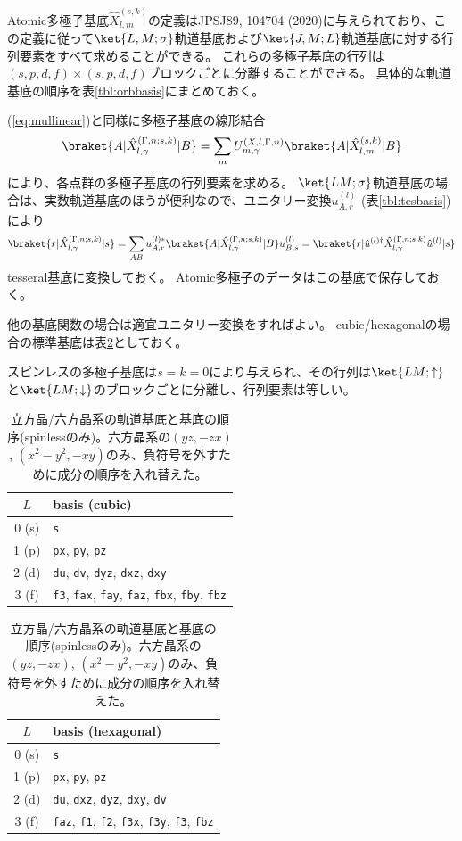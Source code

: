 \documentclass[11pt]{easymemo}
\begin{document}
Atomic多極子基底$\hat{X}_{l,m}^{(s,k)}$の定義はJPSJ89, 104704 (2020)に与えられており、この定義に従って$\ket{L,M;\sigma}$軌道基底および$\ket{J,M;L}$軌道基底に対する行列要素をすべて求めることができる。
これらの多極子基底の行列は$(s,p,d,f)\times(s,p,d,f)$ブロックごとに分離することができる。
具体的な軌道基底の順序を表\ref{tbl:orbbasis}にまとめておく。

(\ref{eq:mullinear})と同様に多極子基底の線形結合
\begin{align}
\braket{A|\hat{X}_{l,\gamma}^{(\Gamma,n;s,k)}|B}=\sum_{m}U_{m,\gamma}^{(X,l,\Gamma,n)}\braket{A|\hat{X}_{l,m}^{(s,k)}|B}
\end{align}
により、各点群の多極子基底の行列要素を求める。
$\ket{LM;\sigma}$軌道基底の場合は、実数軌道基底のほうが便利なので、ユニタリー変換$u_{A,r}^{(l)}$ (表\ref{tbl:tesbasis})により
\begin{align}
\braket{r|\hat{X}_{l,\gamma}^{(\Gamma,n;s,k)}|s}
=
\sum_{AB}
u_{A,r}^{(l)*}
\braket{A|\hat{X}_{l,\gamma}^{(\Gamma,n;s,k)}|B}
u_{B,s}^{(l)}
=
\braket{r|\hat{u}^{(l)\dagger}
\hat{X}_{l,\gamma}^{(\Gamma,n;s,k)}
\hat{u}^{(l)}|s}
\end{align}
tesseral基底に変換しておく。
Atomic多極子のデータはこの基底で保存しておく。

他の基底関数の場合は適宜ユニタリー変換をすればよい。
cubic/hexagonalの場合の標準基底は表\ref{tbl:uorb}としておく。


スピンレスの多極子基底は$s=k=0$により与えられ、その行列は$\ket{LM;\uparrow}$と$\ket{LM;\downarrow}$のブロックごとに分離し、行列要素は等しい。

\begin{table}[ht!]
\begin{center}
\small
\caption{立方晶/六方晶系の軌道基底と基底の順序(spinlessのみ)。六方晶系の$(yz,-zx)$, $(x^{2}-y^{2},-xy)$のみ、負符号を外すために成分の順序を入れ替えた。}
\label{tbl:uorb}
\begin{tabular}{cl} \hline\hline
$L$ & basis (cubic) \\ \hline
0 (s) & {\tt s} \\ \hline
1 (p) & {\tt px}, {\tt py}, {\tt pz} \\ \hline
2 (d) & {\tt du}, {\tt dv}, {\tt dyz}, {\tt dxz}, {\tt dxy} \\ \hline
3 (f) & {\tt f3}, {\tt fax}, {\tt fay}, {\tt faz}, {\tt fbx}, {\tt fby}, {\tt fbz} \\
\hline\hline
\end{tabular}
\begin{tabular}{cl} \hline\hline
$L$ & basis (hexagonal) \\ \hline
0 (s) & {\tt s} \\ \hline
1 (p) & {\tt px}, {\tt py}, {\tt pz} \\ \hline
2 (d) & {\tt du}, {\tt dxz}, {\tt dyz}, {\tt dxy}, {\tt dv} \\ \hline
3 (f) & {\tt faz}, {\tt f1}, {\tt f2}, {\tt f3x}, {\tt f3y}, {\tt f3}, {\tt fbz} \\
\hline\hline
\end{tabular}
\end{center}
\end{table}
\end{document}
